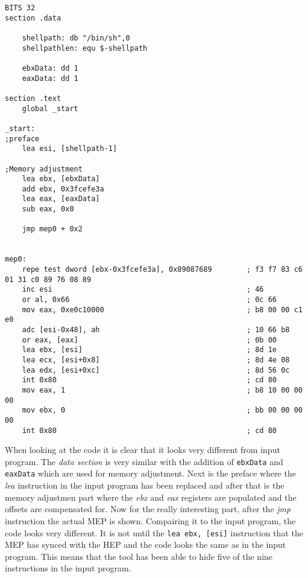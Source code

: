 \documentclass[11pt,twoside]{eitExjobb}
\begin{document}
\begin{Verbatim}[fontsize=\tiny]
BITS 32
section .data

    shellpath: db "/bin/sh",0
    shellpathlen: equ $-shellpath

    ebxData: dd 1
    eaxData: dd 1

section .text
    global _start

_start:
;preface
    lea esi, [shellpath-1]

;Memory adjustment
    lea ebx, [ebxData]
    add ebx, 0x3fcefe3a
    lea eax, [eaxData]
    sub eax, 0x0

    jmp mep0 + 0x2


mep0:
    repe test dword [ebx-0x3fcefe3a], 0x89087689        ; f3 f7 83 c6 01 31 c0 89 76 08 89
    inc esi                                             ; 46
    or al, 0x66                                         ; 0c 66 
    mov eax, 0xe0c10000                                 ; b8 00 00 c1 e0
    adc [esi-0x48], ah                                  ; 10 66 b8
    or eax, [eax]                                       ; 0b 00
    lea ebx, [esi]                                      ; 8d 1e
    lea ecx, [esi+0x8]                                  ; 8d 4e 08
    lea edx, [esi+0xc]                                  ; 8d 56 0c
    int 0x80                                            ; cd 80
    mov eax, 1                                          ; b8 10 00 00 00
    mov ebx, 0                                          ; bb 00 00 00 00
    int 0x80                                            ; cd 80
\end{Verbatim}

\noindent When looking at the code it is clear that it looks very different from input program. The \emph{data section} is very similar with the addition of \texttt{ebxData} and \texttt{eaxData} which are used for memory adjustment. Next is the preface where the \emph{lea} instruction in the input program has been replaced and after that is the memory adjustmen part where the \emph{ebx} and \emph{eax} registers are populated and the offsets are compensated for. Now for the really interesting part, after the \emph{jmp} instruction the actual MEP is shown. Compairing it to the input program, the code looks very different. It is not until the \texttt{lea ebx, [esi]} instruction that the MEP has synced with the HEP and the code looks the same as in the input program. This means that the tool has been able to hide five of the nine instructions in the input program.
\end{document}
